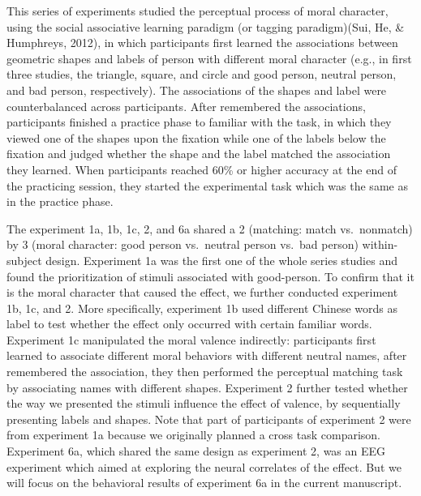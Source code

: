\documentclass[
  english,
  man]{apa6}
\begin{document}
This series of experiments studied the perceptual process of moral character, using the social associative learning paradigm (or tagging paradigm)(Sui, He, \& Humphreys, 2012), in which participants first learned the associations between geometric shapes and labels of person with different moral character (e.g., in first three studies, the triangle, square, and circle and good person, neutral person, and bad person, respectively). The associations of the shapes and label were counterbalanced across participants. After remembered the associations, participants finished a practice phase to familiar with the task, in which they viewed one of the shapes upon the fixation while one of the labels below the fixation and judged whether the shape and the label matched the association they learned. When participants reached 60\% or higher accuracy at the end of the practicing session, they started the experimental task which was the same as in the practice phase.

The experiment 1a, 1b, 1c, 2, and 6a shared a 2 (matching: match vs.~nonmatch) by 3 (moral character: good person vs.~neutral person vs.~bad person) within-subject design. Experiment 1a was the first one of the whole series studies and found the prioritization of stimuli associated with good-person. To confirm that it is the moral character that caused the effect, we further conducted experiment 1b, 1c, and 2. More specifically, experiment 1b used different Chinese words as label to test whether the effect only occurred with certain familiar words. Experiment 1c manipulated the moral valence indirectly: participants first learned to associate different moral behaviors with different neutral names, after remembered the association, they then performed the perceptual matching task by associating names with different shapes. Experiment 2 further tested whether the way we presented the stimuli influence the effect of valence, by sequentially presenting labels and shapes. Note that part of participants of experiment 2 were from experiment 1a because we originally planned a cross task comparison. Experiment 6a, which shared the same design as experiment 2, was an EEG experiment which aimed at exploring the neural correlates of the effect. But we will focus on the behavioral results of experiment 6a in the current manuscript.
\end{document}
